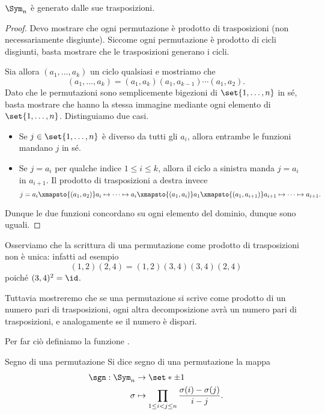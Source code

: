 \begin{proposition}
    {}{}
    $\Sym_n$ è generato dalle sue trasposizioni.
\end{proposition}
\begin{proof}
    Devo mostrare che ogni permutazione è prodotto di trasposizioni (non necessariamente disgiunte). Siccome ogni permutazione è prodotto di cicli disgiunti, basta mostrare che le trasposizioni generano i cicli.

    Sia allora $(a_1, \dots, a_k)$ un ciclo qualsiasi e mostriamo che \[
        (a_1, \dots, a_k) = (a_1, a_k)(a_1, a_{k-1})\cdots(a_1, a_2).
    \] Dato che le permutazioni sono semplicemente bigezioni di $\set{1, \dots, n}$ in sé, basta mostrare che hanno la stessa immagine mediante ogni elemento di $\set{1, \dots, n}$. Distinguiamo due casi.

    \begin{itemize}
        \item Se $j \in \set{1, \dots, n}$ è diverso da tutti gli $a_i$, allora entrambe le funzioni mandano $j$ in sé.
        \item Se $j = a_i$ per qualche indice $1 \leq i \leq k$, allora il ciclo a sinistra manda $j = a_i$ in $a_{i + 1}$. Il prodotto di trasposizioni a destra invece \[
            j = a_i \xmapsto{(a_1, a_2)} a_i \mapsto \dots \mapsto a_i \xmapsto{(a_1, a_i)} a_1 \xmapsto{(a_1, a_{i+1})} a_{i+1} \mapsto \dots \mapsto a_{i+1}.
        \]
    \end{itemize}

    Dunque le due funzioni concordano su ogni elemento del dominio, dunque sono uguali.
\end{proof}

Osserviamo che la scrittura di una permutazione come prodotto di trasposizioni non è unica: infatti ad esempio \[
    (1, 2)(2, 4) = (1, 2)(3, 4)(3, 4)(2, 4)
\] poiché $(3, 4)^2 = \id$.

Tuttavia mostreremo che se una permutazione si scrive come prodotto di un numero pari di trasposizioni, ogni altra decomposizione avrà un numero pari di trasposizioni, e analogamente se il numero è dispari.

Per far ciò definiamo la funzione .

\begin{definition}
    {Segno di una permutazione}{}
    Si dice segno di una permutazione la mappa \begin{align*}
        \sgn : \Sym_n &\to \set*{\pm 1}\\
        \sigma &\mapsto \prod_{1 \leq i < j \leq n} \frac{\sigma(i) - \sigma(j)}{i - j}.
    \end{align*}
\end{definition}

